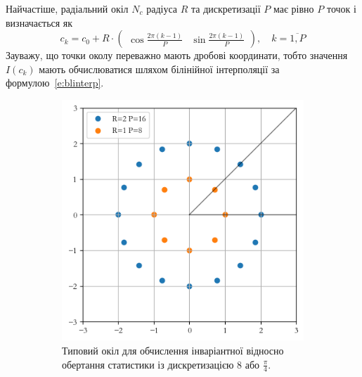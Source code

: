 Найчастіше, радіальний окіл $N_c$ радіуса $R$ та дискретизації $P$ має рівно $P$ точок і визначається як
\begin{equation}\label{e:circle}
    c_k = c_0 + R \cdot \begin{pmatrix} \cos \frac{2\pi (k-1)}{P} & \sin \frac{2\pi (k-1)}{P} \end{pmatrix}, \quad k=\overline{1,P}
\end{equation}
Зауважу, що точки околу переважно мають дробові координати, тобто значення $I(c_k)$ мають обчислюватися шляхом білінійної інтерполяції за формулою~\eqref{e:blinterp}.

\begin{figure}[h]
    \begin{subfigure}{0.48\textwidth}
    \includegraphics[width=0.9\linewidth]{img/clique-2.png} 
    \caption{
        Типовий окіл для обчислення інваріантної відносно обертання статистики із дискретизацією 8 або $\frac{\pi}{4}$. 
    }
    \label{subfig:clique-2a}
    \end{subfigure}%
    \hfill
    \begin{subfigure}{0.48\textwidth}

\end{subfigure}
\end{figure}
